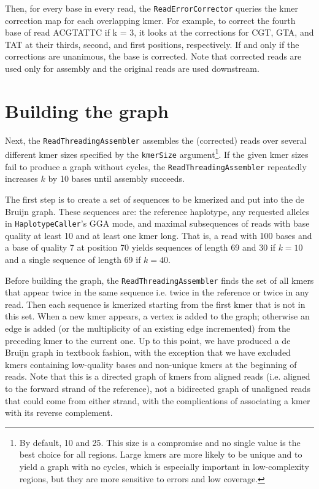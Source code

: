\documentclass[nofootinbib,amssymb,amsmath]{revtex4}
\newcommand{\HC}{\texttt{HaplotypeCaller}}
\newcommand{\code}[1]{\texttt{#1}}
\begin{document}
Then, for every base in every read, the \code{ReadErrorCorrector} queries the kmer correction map for each overlapping kmer.  For example, to correct the fourth base of read ACGTATTC if k = 3, it looks at the corrections for CGT, GTA, and TAT at their thirds, second, and first positions, respectively.  If and only if the corrections are unanimous, the base is corrected.  Note that corrected reads are used only for assembly and the original reads are used downstream.

\section{Building the graph} \label{graph-assembly}
Next, the \code{ReadThreadingAssembler} assembles the (corrected) reads over several different kmer sizes specified by the \code{kmerSize} argument\footnote{By default, 10 and 25.  This size is a compromise and no single value is the best choice for all regions.  Large kmers are more likely to be unique and to yield a graph with no cycles, which is especially important in low-complexity regions, but they are more sensitive to errors and low coverage.}.  If the given kmer sizes fail to produce a graph without cycles, the \code{ReadThreadingAssembler} repeatedly increases $k$ by 10 bases until assembly succeeds.

The first step is to create a set of sequences to be kmerized and put into the de Bruijn graph.  These sequences are: the reference haplotype, any requested alleles in \HC's GGA mode, and maximal subsequences of reads with base quality at least 10 and at least one kmer long.  That is, a read with 100 bases and a base of quality 7 at position 70 yields sequences of length 69 and 30 if $k = 10$ and a single sequence of length 69 if $k = 40$.

Before building the graph, the \code{ReadThreadingAssembler} finds the set of all kmers that appear twice in the same sequence i.e. twice in the reference or twice in any read.  Then each sequence is kmerized starting from the first kmer that is not in this set.  When a new kmer appears, a vertex is added to the graph; otherwise an edge is added (or the multiplicity of an existing edge incremented) from the preceding kmer to the current one.  Up to this point, we have produced a de Bruijn graph in textbook fashion, with the exception that we have excluded kmers containing low-quality bases and non-unique kmers at the beginning of reads.  Note that this is a directed graph of kmers from aligned reads (i.e. aligned to the forward strand of the reference), not a bidirected graph of unaligned reads that could come from either strand, with the complications of associating a kmer with its reverse complement.
\end{document}
